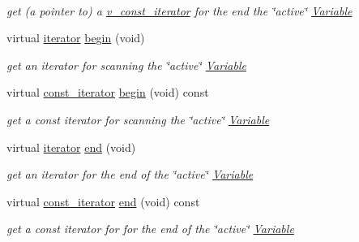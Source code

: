 \begin{Indent}
\begin{DoxyCompactItemize}
$$\begin{DoxyCompactList}\small\item\em get (a pointer to) a \mbox{\hyperlink{class_s_m_spp__di__unipi__it_1_1_thin_var_dep_interface_1_1v__const__iterator}{v\+\_\+const\+\_\+iterator}} for the end the \char`\"{}active\char`\"{} \mbox{\hyperlink{class_s_m_spp__di__unipi__it_1_1_variable}{Variable}} \end{DoxyCompactList}\item 
virtual \mbox{\hyperlink{class_s_m_spp__di__unipi__it_1_1_thin_var_dep_interface_1_1iterator}{iterator}} \mbox{\hyperlink{group___thin_var_dep_interface___c_l_a_s_s_e_s_ga79162df6cbf36b4997db545dc30969e2}{begin}} (void)
\begin{DoxyCompactList}\small\item\em get an iterator for scanning the \char`\"{}active\char`\"{} \mbox{\hyperlink{class_s_m_spp__di__unipi__it_1_1_variable}{Variable}} \end{DoxyCompactList}\item 
virtual \mbox{\hyperlink{class_s_m_spp__di__unipi__it_1_1_thin_var_dep_interface_1_1const__iterator}{const\+\_\+iterator}} \mbox{\hyperlink{group___thin_var_dep_interface___c_l_a_s_s_e_s_ga4780b8a1692a5b1b810ace218aec9c63}{begin}} (void) const
\begin{DoxyCompactList}\small\item\em get a const iterator for scanning the \char`\"{}active\char`\"{} \mbox{\hyperlink{class_s_m_spp__di__unipi__it_1_1_variable}{Variable}} \end{DoxyCompactList}\item 
virtual \mbox{\hyperlink{class_s_m_spp__di__unipi__it_1_1_thin_var_dep_interface_1_1iterator}{iterator}} \mbox{\hyperlink{group___thin_var_dep_interface___c_l_a_s_s_e_s_gae1175d5cbc6627e3e49ed9bcb58ffce9}{end}} (void)
\begin{DoxyCompactList}\small\item\em get an iterator for the end of the \char`\"{}active\char`\"{} \mbox{\hyperlink{class_s_m_spp__di__unipi__it_1_1_variable}{Variable}} \end{DoxyCompactList}\item 
virtual \mbox{\hyperlink{class_s_m_spp__di__unipi__it_1_1_thin_var_dep_interface_1_1const__iterator}{const\+\_\+iterator}} \mbox{\hyperlink{group___thin_var_dep_interface___c_l_a_s_s_e_s_gabd4acdc34e7627e7740feff502da77e1}{end}} (void) const
\begin{DoxyCompactList}\small\item\em get a const iterator for for the end of the \char`\"{}active\char`\"{} \mbox{\hyperlink{class_s_m_spp__di__unipi__it_1_1_variable}{Variable}} \end{DoxyCompactList}\end{DoxyCompactItemize}
\end{Indent}
